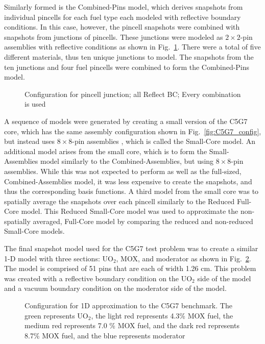 \documentclass[5p,times,twocolumn,10pt]{elsarticle}
\newcommand{\FIG}[1]{Fig.~\ref{#1}}               %
\begin{document}
Similarly formed is the 
Combined-Pins model, which derives snapshots from individual pincells for each 
fuel type each modeled with reflective boundary conditions.  In this case, however, 
the pincell snapshots were combined with snapshots from junctions of 
pincells. These junctions were modeled as 
$2\times2$-pin assemblies with 
reflective conditions as shown in \FIG{fig:junction}.  There were a total of five different materials, thus 
ten unique junctions to model. The snapshots from the ten junctions and four 
fuel pincells were combined to form the Combined-Pins model.

\begin{figure}[htb]
    \centering
    \resizebox{0.45\columnwidth}{!}{
    }
    \caption{Configuration for pincell junction; all Reflect BC; Every 
        combination is used}
    \label{fig:junction}
\end{figure}

A sequence of models were generated by creating a small version of the C5G7 core, which 
has the same assembly configuration shown in \FIG{fig:C5G7_config}, but 
instead uses $8\times8$-pin assemblies \cite{reedThesis}, which is called
the Small-Core model.  An additional model 
arises from the small core, which is to form the Small-Assemblies model 
similarly to the Combined-Assemblies, but using $8\times8$-pin assemblies. 
While this was not expected to perform as well as the full-sized, 
Combined-Assemblies model, it was less expensive to create the snapshots, and 
thus the corresponding basis functions.  
A third model from the small core was to spatially 
average the snapshots over each pincell similarly to the Reduced Full-Core model.  This Reduced Small-Core model was used to approximate the 
non-spatially averaged, Full-Core model by comparing the reduced and non-reduced 
Small-Core models.  

The final snapshot model used for the C5G7 test problem was to create a 
similar 1-D model with three sections: UO$_2$, MOX, and 
moderator as shown in \FIG{fig:1d_config}.  The model is comprised of 51 pins that are each of width 1.26 cm.  
This problem was created with a reflective boundary condition on the UO$_2$ 
side of the model and a vacuum boundary condition on the moderator side of the 
model.

\begin{figure}[htb]
    \centering
    \resizebox{0.9\columnwidth}{!}{
    }
    \caption{Configuration for 1D approximation to the C5G7 benchmark.  The 
             green represents UO$_2$, the light red represents 
             4.3\% MOX fuel, the medium red represents 7.0 \% MOX fuel, and the 
             dark red represents 8.7\% MOX fuel, and the blue 
             represents moderator}
    \label{fig:1d_config}
\end{figure}
\end{document}
